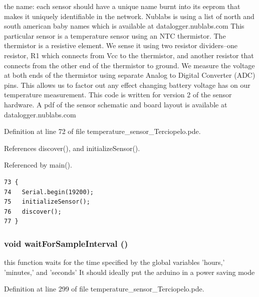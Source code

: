 the name: each sensor should have a unique name burnt into its eeprom that makes it uniquely identifiable in the network. Nublabs is using a list of north and south american baby names which is available at datalogger.nublabs.com This particular sensor is a temperature sensor using an NTC thermistor. The thermistor is a resistive element. We sense it using two resistor dividers--one resistor, R1 which connects from Vcc to the thermistor, and another resistor that connects from the other end of the thermistor to ground. We measure the voltage at both ends of the thermistor using separate Analog to Digital Converter (ADC) pins. This allows us to factor out any effect changing battery voltage has on our temperature measurement. This code is written for version 2 of the sensor hardware. A pdf of the sensor schematic and board layout is available at datalogger.nublabs.com 

Definition at line 72 of file temperature\_\-sensor\_\-Terciopelo.pde.

References discover(), and initializeSensor().

Referenced by main().

\begin{Code}\begin{verbatim}73 {
74   Serial.begin(19200);
75   initializeSensor();
76   discover();
77 }
\end{verbatim}
\end{Code}


\hypertarget{temperature__sensor___terciopelo_8pde_b4dbd8380e5d93ead613cf38e6083b7f}{
\subsubsection[{waitForSampleInterval}]{\setlength{\rightskip}{0pt plus 5cm}void waitForSampleInterval ()}}
\label{temperature__sensor___terciopelo_8pde_b4dbd8380e5d93ead613cf38e6083b7f}


this function waits for the time specified by the global variables 'hours,' 'minutes,' and 'seconds' It should ideally put the arduino in a power saving mode 



Definition at line 299 of file temperature\_\-sensor\_\-Terciopelo.pde.

